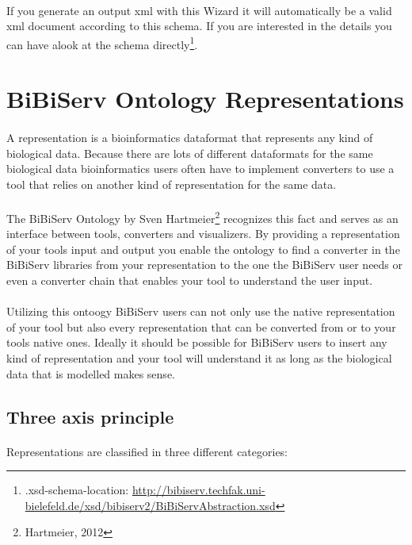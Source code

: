 \documentclass[a4paper,10pt]{book}
\begin{document}
\paragraph{} If you generate an output xml with this Wizard it will automatically be a valid xml document according to this schema. If you are interested in the details you can have alook at the schema directly\footnote{.xsd-schema-location: \url{http://bibiserv.techfak.uni-bielefeld.de/xsd/bibiserv2/BiBiServAbstraction.xsd}}.

\section{BiBiServ Ontology Representations}
\label{representations}
\paragraph{} A representation is a bioinformatics dataformat that represents any kind of biological data. Because there are lots of different dataformats for the same biological data bioinformatics users often have to implement converters to use a tool that relies on another kind of representation for the same data.
\paragraph{} The BiBiServ Ontology by Sven Hartmeier\footnote{Hartmeier, 2012}
recognizes this fact and serves as an interface between tools, converters and visualizers. By providing a representation of your tools input and output you enable the ontology to find a converter in the BiBiServ libraries from your representation to the one the BiBiServ user needs or even a converter chain that enables your tool to understand the user input.
\paragraph{} Utilizing this ontoogy BiBiServ users can not only use the native representation of your tool but also every representation that can be converted from or to your tools native ones. Ideally it should be possible for BiBiServ users to insert any kind of representation and your tool will understand it as long as the biological data that is modelled makes sense.
\subsection{Three axis principle}
\paragraph{} Representations are classified in three different categories:
\end{document}
